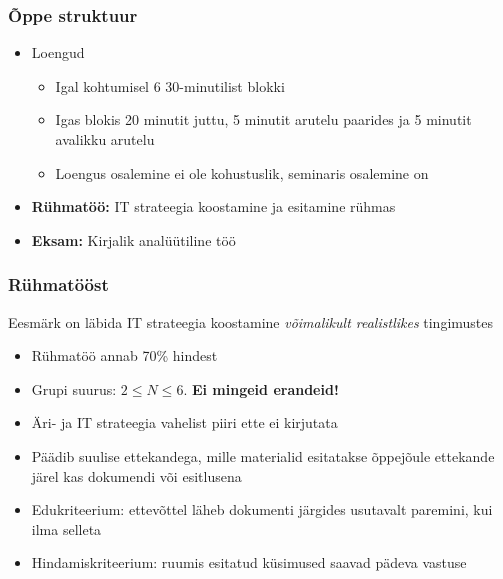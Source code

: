 \begin{frame}[fragile]
  \frametitle{Õppe struktuur}
	\begin{itemize}
	\item Loengud
	\begin{itemize}
		\item Igal kohtumisel 6 30-minutilist blokki
		\item Igas blokis 20 minutit juttu, 5 minutit arutelu paarides ja 5 minutit avalikku arutelu
		\item Loengus osalemine ei ole kohustuslik, seminaris osalemine on
	\end{itemize}
	\item \textbf{Rühmatöö:} IT strateegia koostamine ja esitamine rühmas
	\item \textbf{Eksam:} Kirjalik analüütiline töö

	\end{itemize}
\end{frame}

\begin{frame}[fragile]
  \frametitle{Rühmatööst}
Eesmärk on läbida IT strateegia koostamine \emph{võimalikult realistlikes} tingimustes 
  	\begin{itemize}
		\item Rühmatöö annab 70\% hindest
		\item Grupi suurus: $2\leq N\leq6$. \textbf{Ei mingeid erandeid!}
		\item Äri- ja IT strateegia vahelist piiri ette ei kirjutata
		\item Päädib suulise ettekandega, mille materialid esitatakse õppejõule ettekande järel kas dokumendi või esitlusena
		\item Edukriteerium: ettevõttel läheb dokumenti järgides usutavalt paremini, kui ilma selleta
		\item Hindamiskriteerium: ruumis esitatud küsimused saavad pädeva vastuse
	\end{itemize}
\end{frame}

